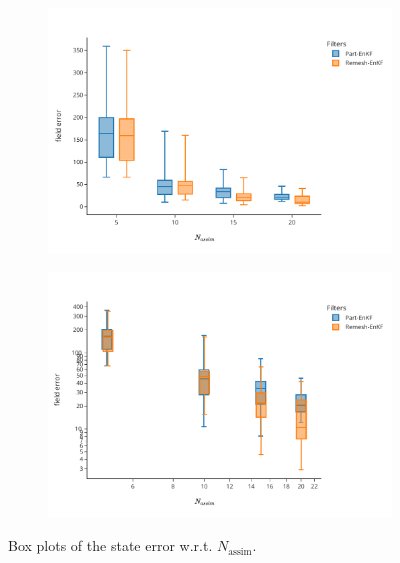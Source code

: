 \begin{figure}[h!]
	\centering
	\begin{subfigure}{0.49\linewidth}
		\centering
		\includegraphics[width=\linewidth]{./images/app2d/final/MSE_na_box.pdf}
		\caption{}
		\label{fig:na_1}

	\end{subfigure}
	\begin{subfigure}{0.49\linewidth}
		\centering
		\includegraphics[width=\linewidth]{./images/app2d/final/MSE_na_box_log_log.pdf}
		\caption{}
		\label{fig:na_2}
	\end{subfigure}
	\caption{Box plots of the state error w.r.t. $N_{\text{assim}}$.}
	\label{fig:na}

\end{figure}

